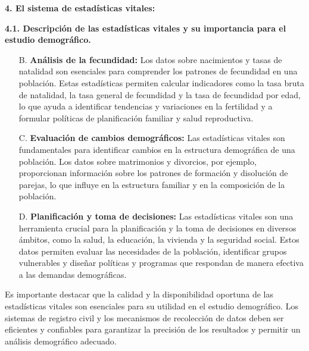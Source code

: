 \documentclass[8pt,a4paper]{beamer}
\begin{document}
{\begin{frame}{\textbf{4. El sistema de estadísticas vitales:}}
\begin{block}{\textbf{4.1. Descripción de las estadísticas vitales y su importancia para el estudio demográfico.}}
\begin{enumerate}
\item[B.] \textbf{Análisis de la fecundidad:} Los datos sobre nacimientos y tasas de natalidad son esenciales para comprender los patrones de fecundidad en una población. Estas estadísticas permiten calcular indicadores como la tasa bruta de natalidad, la tasa general de fecundidad y la tasa de fecundidad por edad, lo que ayuda a identificar tendencias y variaciones en la fertilidad y a formular políticas de planificación familiar y salud reproductiva.
\end{enumerate}
\end{block}
\end{frame}

\begin{frame}{}

\begin{block}{}
\justifying
\begin{enumerate}
\justifying
\item[C.] \textbf{Evaluación de cambios demográficos:} Las estadísticas vitales son fundamentales para identificar cambios en la estructura demográfica de una población. Los datos sobre matrimonios y divorcios, por ejemplo, proporcionan información sobre los patrones de formación y disolución de parejas, lo que influye en la estructura familiar y en la composición de la población.

\item[D.] \textbf{Planificación y toma de decisiones:} Las estadísticas vitales son una herramienta crucial para la planificación y la toma de decisiones en diversos ámbitos, como la salud, la educación, la vivienda y la seguridad social. Estos datos permiten evaluar las necesidades de la población, identificar grupos vulnerables y diseñar políticas y programas que respondan de manera efectiva a las demandas demográficas.
\end{enumerate}
Es importante destacar que la calidad y la disponibilidad oportuna de las estadísticas vitales son esenciales para su utilidad en el estudio demográfico. Los sistemas de registro civil y los mecanismos de recolección de datos deben ser eficientes y confiables para garantizar la precisión de los resultados y permitir un análisis demográfico adecuado.
\end{block}
\end{frame}

}
\end{document}
